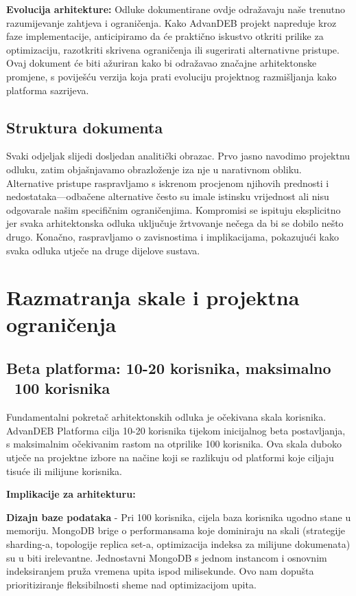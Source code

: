 \documentclass[12pt,a4paper]{article}
\begin{document}
\textbf{Evolucija arhitekture:} Odluke dokumentirane ovdje odražavaju naše trenutno razumijevanje zahtjeva i ograničenja. Kako AdvanDEB projekt napreduje kroz faze implementacije, anticipiramo da će praktično iskustvo otkriti prilike za optimizaciju, razotkriti skrivena ograničenja ili sugerirati alternativne pristupe. Ovaj dokument će biti ažuriran kako bi odražavao značajne arhitektonske promjene, s poviješću verzija koja prati evoluciju projektnog razmišljanja kako platforma sazrijeva.

\subsection{Struktura dokumenta}

Svaki odjeljak slijedi dosljedan analitički obrazac. Prvo jasno navodimo projektnu odluku, zatim objašnjavamo obrazloženje iza nje u narativnom obliku. Alternative pristupe raspravljamo s iskrenom procjenom njihovih prednosti i nedostataka—odbačene alternative često su imale istinsku vrijednost ali nisu odgovarale našim specifičnim ograničenjima. Kompromisi se ispituju eksplicitno jer svaka arhitektonska odluka uključuje žrtvovanje nečega da bi se dobilo nešto drugo. Konačno, raspravljamo o zavisnostima i implikacijama, pokazujući kako svaka odluka utječe na druge dijelove sustava.

\section{Razmatranja skale i projektna ograničenja}

\subsection{Beta platforma: 10-20 korisnika, maksimalno ~100 korisnika}

Fundamentalni pokretač arhitektonskih odluka je očekivana skala korisnika. AdvanDEB Platforma cilja 10-20 korisnika tijekom inicijalnog beta postavljanja, s maksimalnim očekivanim rastom na otprilike 100 korisnika. Ova skala duboko utječe na projektne izbore na načine koji se razlikuju od platformi koje ciljaju tisuće ili milijune korisnika.

\textbf{Implikacije za arhitekturu:}

\textbf{Dizajn baze podataka} - Pri 100 korisnika, cijela baza korisnika ugodno stane u memoriju. MongoDB brige o performansama koje dominiraju na skali (strategije sharding-a, topologije replica set-a, optimizacija indeksa za milijune dokumenata) su u biti irelevantne. Jednostavni MongoDB s jednom instancom i osnovnim indeksiranjem pruža vremena upita ispod milisekunde. Ovo nam dopušta prioritiziranje fleksibilnosti sheme nad optimizacijom upita.
\end{document}
